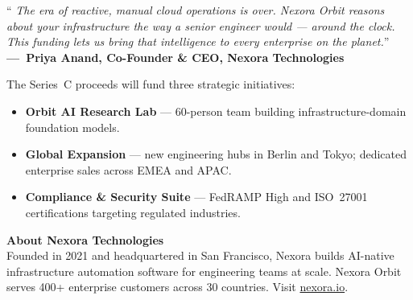 \documentclass[10pt,a4paper]{article}
\newcommand{\hrulethin}{{\color{ruled}\rule{\linewidth}{0.5pt}}}
\begin{document}
\vspace{4pt}
\begin{tcolorbox}[pullstyle]
  {\color{accentdark}\large``}{\itshape\color{neutral}%
    The era of reactive, manual cloud operations is over. Nexora Orbit
    reasons about your infrastructure the way a senior engineer would —
    around the clock. This funding lets us bring that intelligence to
    every enterprise on the planet.}{\color{accentdark}\large''}\\[3pt]
  {\color{muted}\small\bfseries —~Priya Anand, Co-Founder \& CEO, Nexora Technologies}
\end{tcolorbox}
\vspace{4pt}

The Series~C proceeds will fund three strategic initiatives:
\begin{itemize}[leftmargin=1.3em,itemsep=0pt,topsep=1pt,parsep=0pt]
  \item {\bfseries Orbit AI Research Lab} — 60-person team building
        infrastructure-domain foundation models.
  \item {\bfseries Global Expansion} — new engineering hubs in Berlin and
        Tokyo; dedicated enterprise sales across EMEA and APAC.
  \item {\bfseries Compliance \& Security Suite} — FedRAMP High and
        ISO~27001 certifications targeting regulated industries.
\end{itemize}

\vspace{4pt}\hrulethin\vspace{5pt}

\begin{tcolorbox}[boilerstyle]
  {\color{accent}\bfseries\small About Nexora Technologies}\\[2pt]
  {\fontsize{8.5}{11}\selectfont\color{neutral}%
    Founded in 2021 and headquartered in San Francisco, Nexora builds
    AI-native infrastructure automation software for engineering teams at
    scale. Nexora Orbit serves 400+ enterprise customers across 30 countries.
    Visit \href{https://nexora.io}{\color{accent}nexora.io}.}
\end{tcolorbox}

\vspace{5pt}
\end{document}

